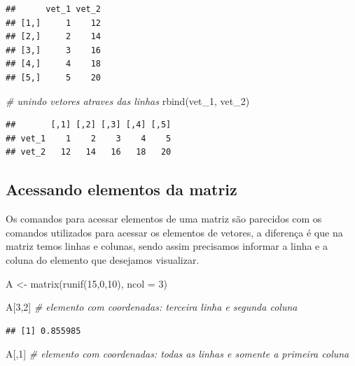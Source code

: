 \documentclass[
]{book}
\newenvironment{Shaded}{\begin{snugshade}}{\end{snugshade}}
\newcommand{\AttributeTok}[1]{\textcolor[rgb]{0.77,0.63,0.00}{#1}}
\newcommand{\CommentTok}[1]{\textcolor[rgb]{0.56,0.35,0.01}{\textit{#1}}}
\newcommand{\DecValTok}[1]{\textcolor[rgb]{0.00,0.00,0.81}{#1}}
\newcommand{\FunctionTok}[1]{\textcolor[rgb]{0.00,0.00,0.00}{#1}}
\newcommand{\NormalTok}[1]{#1}
\newcommand{\OtherTok}[1]{\textcolor[rgb]{0.56,0.35,0.01}{#1}}
\begin{document}
\begin{verbatim}
##      vet_1 vet_2
## [1,]     1    12
## [2,]     2    14
## [3,]     3    16
## [4,]     4    18
## [5,]     5    20
\end{verbatim}

\begin{Shaded}
\begin{Highlighting}[]
\CommentTok{\# unindo vetores atraves das linhas}
\FunctionTok{rbind}\NormalTok{(vet\_1, vet\_2)}
\end{Highlighting}
\end{Shaded}

\begin{verbatim}
##       [,1] [,2] [,3] [,4] [,5]
## vet_1    1    2    3    4    5
## vet_2   12   14   16   18   20
\end{verbatim}

\hypertarget{acessando-elementos-da-matriz}{%
\subsection{Acessando elementos da matriz}\label{acessando-elementos-da-matriz}}

Os comandos para acessar elementos de uma matriz são parecidos com os comandos utilizados para acessar os elementos de vetores, a diferença é que na matriz temos linhas e colunas, sendo assim precisamos informar a linha e a coluna do elemento que desejamos visualizar.

\begin{Shaded}
\begin{Highlighting}[]
\NormalTok{A }\OtherTok{\textless{}{-}} \FunctionTok{matrix}\NormalTok{(}\FunctionTok{runif}\NormalTok{(}\DecValTok{15}\NormalTok{,}\DecValTok{0}\NormalTok{,}\DecValTok{10}\NormalTok{), }\AttributeTok{ncol =} \DecValTok{3}\NormalTok{)}

\NormalTok{A[}\DecValTok{3}\NormalTok{,}\DecValTok{2}\NormalTok{] }\CommentTok{\# elemento com coordenadas: terceira linha  e segunda coluna}
\end{Highlighting}
\end{Shaded}

\begin{verbatim}
## [1] 0.855985
\end{verbatim}

\begin{Shaded}
\begin{Highlighting}[]
\NormalTok{A[,}\DecValTok{1}\NormalTok{] }\CommentTok{\# elemento com coordenadas: todas as linhas e somente a primeira coluna}
\end{Highlighting}
\end{Shaded}
\end{document}
